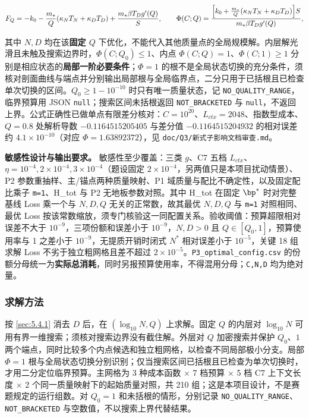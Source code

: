 \begin{equation*}
F_Q=-k_0-\frac{m_*}{Q}(\kappa_NT_N+\kappa_DT_D)+\frac{m_*\beta T_Dg'(Q)}{S},\qquad
\Phi(C;Q)=\frac{\Bigl[k_0+\frac{m_*}{Q}(\kappa_NT_N+\kappa_DT_D)\Bigr]S}{m_*\beta T_Dg'(Q)},
\end{equation*}

其中 $N,D$ 均在该\textbf{固定 $Q$} 下优化，不能代入其他质量点的全局规模解。内层解光滑且未触及搜索边界时，$\Phi(C;Q_0)\le1$、内点 $\Phi(C;Q)=1$、$\Phi(C;1)\ge1$ 分别是相应状态的\textbf{局部一阶必要条件}；$\Phi=1$ 的根不是全局状态切换的充分条件，须核对剖面曲线与端点并分别输出局部根与全局临界点，二分只用于已括根且已检查单次切换的区间。$Q_0\ge1-10^{-10}$ 时只有唯一质量状态，记 \texttt{NO\_QUALITY\_RANGE}，临界预算用 JSON \texttt{null}；搜索区间未括根返回 \texttt{NOT\_BRACKETED} 与 \texttt{null}，不返回上界。公式正确性已做单点有限差分核对：$C=10^{20}$、$L_{ctx}=2048$、指数型成本、$Q=0.8$ 处解析导数 $-0.1164515205405$ 与差分值 $-0.1164515204932$ 的相对误差约 $4.1\times10^{-10}$（对应 $\Phi=1.63892372$），见 \texttt{doc/Q3/新式子影响文档审查.md}。

\textbf{敏感性设计与输出要求。} 敏感性至少覆盖：三类 $g$、C7 五档 $L_{ctx}$、$\eta=10^{-4},2\times10^{-4},3\times10^{-4}$（题设固定 $2\times10^{-4}$，另两值只是本项目扰动情景）、P2 参数重抽样、主/锚点两种质量映射、P1 域质量与配比不确定性，以及固定配比乘子 \texttt{m=1}、H\_tot 与 P2 无地板参数对照。其中 H\_tot 在固定 $\bp^*$ 时对完整基线 Loss 乘一个与 $N,D,Q$ 无关的正常数，故其最优 $N,D,Q$ 与 \texttt{m=1} 对照相同、最优 Loss 按该常数缩放，须专门核验这一同配置关系。验收阈值：预算超限相对误差不大于 $10^{-9}$，三项份额和误差小于 $10^{-9}$，$N,D>0$ 且 $Q\in[Q_0,1]$，预算使用率与 1 之差小于 $10^{-9}$，无提质开销时闭式 $N^*$ 相对误差小于 $10^{-5}$，关键 18 组求解 Loss 不劣于独立粗网格且差不超过 $2\times10^{-5}$。\texttt{P3\_optimal\_config.csv} 的份额分母统一为\textbf{实际总消耗}，同时另报预算使用率，不得混用分母；\texttt{C,N,D} 均为绝对量。

\subsubsection{求解方法}
\label{sec:5.4.2}

按 \ref{sec:5.4.1} 消去 $D$ 后，在 $(\log_{10}N,Q)$ 上求解。固定 $Q$ 的内层对 $\log_{10}N$ 可用有界一维搜索；须核对搜索边界没有截住解。外层对 $Q$ 加密搜索并保护 $Q_0$、$1$ 两个端点，同时比较多个内点候选和独立粗网格，以检查不同局部极小分支。局部 $\Phi=1$ 根与全局状态切换分别识别；仅当搜索区间已括根且已检查为单次切换时，才用二分定位临界预算。主网格为 3 种成本函数 $\times$ 7 档预算 $\times$ 5 档 C7 上下文长度 $\times$ 2 个同一质量映射下的起始质量对照，共 210 组；这是本项目设计，不是赛题规定的运行组数。对 $Q_0=1$ 和未括根的情形，分别记录 \texttt{NO\_QUALITY\_RANGE}、\texttt{NOT\_BRACKETED} 与空数值，不以搜索上界代替结果。

